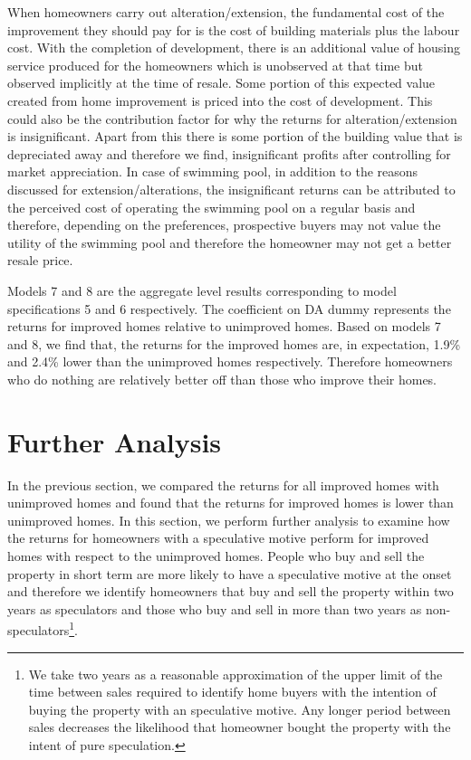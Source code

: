 \documentclass[AEJ,reqno, draftmode]{AEA} %
\begin{document}
When homeowners carry out alteration/extension, the fundamental cost of the improvement they should pay for is the cost of building materials plus the labour cost. With the completion of development, there is an additional value of housing service produced for the homeowners which is unobserved at that time but observed implicitly at the time of resale. Some portion of this expected value created from home improvement is priced into the cost of development. This could also be the contribution factor for why the returns for alteration/extension is insignificant.
Apart from this there is some portion of the building value that is depreciated away and therefore we find, insignificant profits after controlling for market appreciation. In case of swimming pool, in addition to the reasons discussed for extension/alterations, the insignificant returns can be attributed to the perceived cost of operating the swimming pool on a regular basis and therefore, depending on the preferences, prospective buyers may not value the utility of the swimming pool and therefore the homeowner may not get a better resale price.

Models 7 and 8 are the aggregate level results corresponding to model specifications 5 and 6 respectively. The coefficient on DA dummy represents the returns for improved homes relative to unimproved homes. Based on models 7 and 8, we find that, the returns for the improved homes are, in expectation, 1.9\% and 2.4\% lower than the unimproved homes respectively. Therefore homeowners who do nothing are relatively better off than those who improve their homes. 

\clearpage

\section{Further Analysis}

In the previous section, we compared the returns for all improved homes with unimproved homes and found that the returns for improved homes is lower than unimproved homes. In this section, we perform further analysis to examine how the returns for homeowners with a speculative motive perform for improved homes with respect to the unimproved homes. People who buy and sell the property in short term are more likely to have a speculative motive at the onset and therefore we identify homeowners that buy and sell the property within two years as speculators and those who buy and sell in more than two years as non-speculators\footnote{We take two years as a reasonable approximation of the upper limit of the time between sales required to identify home buyers with the intention of buying the property with an speculative motive. Any longer period between sales decreases the likelihood that homeowner bought the property with the intent of pure speculation.}.
\end{document}
